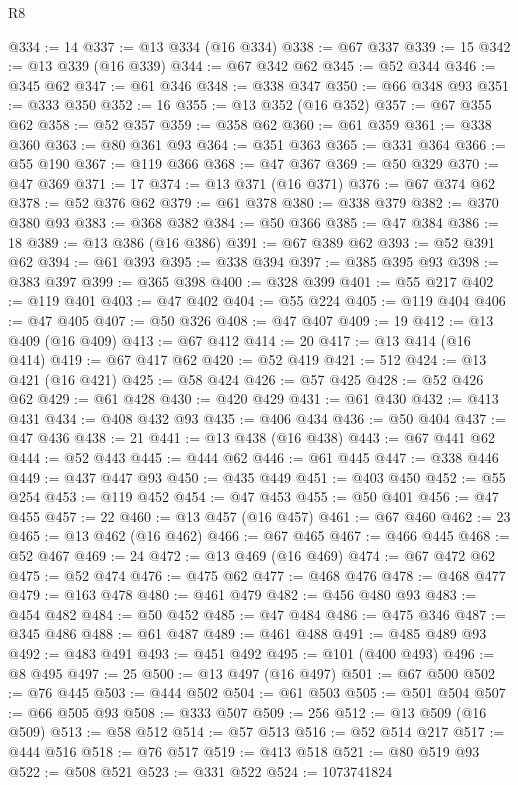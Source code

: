 \begin{lexlean}{R8}
\begin{coremodule}
@334 := 14
@337 := @13 @334 (@16 @334)
@338 := @67 @337
@339 := 15
@342 := @13 @339 (@16 @339)
@344 := @67 @342 @62
@345 := @52 @344
@346 := @345 @62
@347 := @61 @346
@348 := @338 @347
@350 := @66 @348 @93
@351 := @333 @350
@352 := 16
@355 := @13 @352 (@16 @352)
@357 := @67 @355 @62
@358 := @52 @357
@359 := @358 @62
@360 := @61 @359
@361 := @338 @360
@363 := @80 @361 @93
@364 := @351 @363
@365 := @331 @364
@366 := @55 @190
@367 := @119 @366
@368 := @47 @367
@369 := @50 @329
@370 := @47 @369
@371 := 17
@374 := @13 @371 (@16 @371)
@376 := @67 @374 @62
@378 := @52 @376 @62
@379 := @61 @378
@380 := @338 @379
@382 := @370 @380 @93
@383 := @368 @382
@384 := @50 @366
@385 := @47 @384
@386 := 18
@389 := @13 @386 (@16 @386)
@391 := @67 @389 @62
@393 := @52 @391 @62
@394 := @61 @393
@395 := @338 @394
@397 := @385 @395 @93
@398 := @383 @397
@399 := @365 @398
@400 := @328 @399
@401 := @55 @217
@402 := @119 @401
@403 := @47 @402
@404 := @55 @224
@405 := @119 @404
@406 := @47 @405
@407 := @50 @326
@408 := @47 @407
@409 := 19
@412 := @13 @409 (@16 @409)
@413 := @67 @412
@414 := 20
@417 := @13 @414 (@16 @414)
@419 := @67 @417 @62
@420 := @52 @419
@421 := 512
@424 := @13 @421 (@16 @421)
@425 := @58 @424
@426 := @57 @425
@428 := @52 @426 @62
@429 := @61 @428
@430 := @420 @429
@431 := @61 @430
@432 := @413 @431
@434 := @408 @432 @93
@435 := @406 @434
@436 := @50 @404
@437 := @47 @436
@438 := 21
@441 := @13 @438 (@16 @438)
@443 := @67 @441 @62
@444 := @52 @443
@445 := @444 @62
@446 := @61 @445
@447 := @338 @446
@449 := @437 @447 @93
@450 := @435 @449
@451 := @403 @450
@452 := @55 @254
@453 := @119 @452
@454 := @47 @453
@455 := @50 @401
@456 := @47 @455
@457 := 22
@460 := @13 @457 (@16 @457)
@461 := @67 @460
@462 := 23
@465 := @13 @462 (@16 @462)
@466 := @67 @465
@467 := @466 @445
@468 := @52 @467
@469 := 24
@472 := @13 @469 (@16 @469)
@474 := @67 @472 @62
@475 := @52 @474
@476 := @475 @62
@477 := @468 @476
@478 := @468 @477
@479 := @163 @478
@480 := @461 @479
@482 := @456 @480 @93
@483 := @454 @482
@484 := @50 @452
@485 := @47 @484
@486 := @475 @346
@487 := @345 @486
@488 := @61 @487
@489 := @461 @488
@491 := @485 @489 @93
@492 := @483 @491
@493 := @451 @492
@495 := @101 (@400 @493)
@496 := @8 @495
@497 := 25
@500 := @13 @497 (@16 @497)
@501 := @67 @500
@502 := @76 @445
@503 := @444 @502
@504 := @61 @503
@505 := @501 @504
@507 := @66 @505 @93
@508 := @333 @507
@509 := 256
@512 := @13 @509 (@16 @509)
@513 := @58 @512
@514 := @57 @513
@516 := @52 @514 @217
@517 := @444 @516
@518 := @76 @517
@519 := @413 @518
@521 := @80 @519 @93
@522 := @508 @521
@523 := @331 @522
@524 := 1073741824

\end{coremodule}
\end{lexlean}
